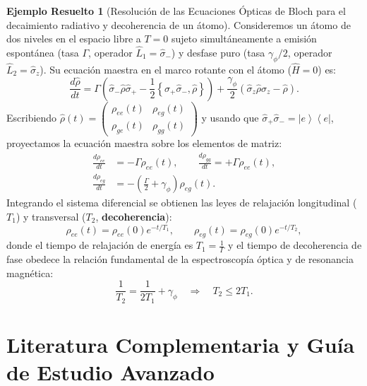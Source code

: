 \documentclass[11pt,a4paper,twoside]{report}
\theoremstyle{definition}
\newtheorem{ejemplo}{Ejemplo Resuelto}[chapter]
\theoremstyle{plain}
\theoremstyle{remark}
\newcommand{\ketbra}[2]{\left| #1 \right\rangle\!\left\langle #2 \right|}
\newcommand{\acomm}[2]{\left\{ #1, #2 \right\}}
\newcommand{\op}[1]{\hat{#1}}
\begin{document}
\begin{ejemplo}[Resolución de las Ecuaciones Ópticas de Bloch para el decaimiento radiativo y decoherencia de un átomo]
Consideremos un átomo de dos niveles en el espacio libre a $T=0$ sujeto simultáneamente a emisión espontánea (tasa $\Gamma$, operador $\op{L}_1 = \op{\sigma}_-$) y desfase puro (tasa $\gamma_\phi/2$, operador $\op{L}_2 = \op{\sigma}_z$). Su ecuación maestra en el marco rotante con el átomo ($\op{H} = 0$) es:
\begin{equation}
    \frac{d\op{\rho}}{dt} = \Gamma\left(\op{\sigma}_-\op{\rho}\op{\sigma}_+ - \frac{1}{2}\acomm{\op{\sigma}_+\op{\sigma}_-}{\op{\rho}}\right) + \frac{\gamma_\phi}{2}\left(\op{\sigma}_z\op{\rho}\op{\sigma}_z - \op{\rho}\right).
\end{equation}
Escribiendo $\op{\rho}(t) = \begin{pmatrix} \rho_{ee}(t) & \rho_{eg}(t) \\ \rho_{ge}(t) & \rho_{gg}(t) \end{pmatrix}$ y usando que $\op{\sigma}_+\op{\sigma}_- = \ketbra{e}{e}$, proyectamos la ecuación maestra sobre los elementos de matriz:
\begin{align}
    \frac{d\rho_{ee}}{dt} &= -\Gamma \rho_{ee}(t), \qquad \frac{d\rho_{gg}}{dt} = +\Gamma \rho_{ee}(t), \\
    \frac{d\rho_{eg}}{dt} &= -\left(\frac{\Gamma}{2} + \gamma_\phi\right)\rho_{eg}(t).
\end{align}
Integrando el sistema diferencial se obtienen las leyes de relajación longitudinal ($T_1$) y transversal ($T_2$, \textbf{decoherencia}):
\begin{equation}
    \rho_{ee}(t) = \rho_{ee}(0)e^{-t/T_1}, \qquad \rho_{eg}(t) = \rho_{eg}(0)e^{-t/T_2},
\end{equation}
donde el tiempo de relajación de energía es $T_1 = \frac{1}{\Gamma}$ y el tiempo de decoherencia de fase obedece la relación fundamental de la espectroscopía óptica y de resonancia magnética:
\begin{equation}
    \frac{1}{T_2} = \frac{1}{2T_1} + \gamma_\phi \quad \Longrightarrow \quad T_2 \le 2T_1.
\end{equation}
\end{ejemplo}

\chapter{Literatura Complementaria y Guía de Estudio Avanzado}
\end{document}
